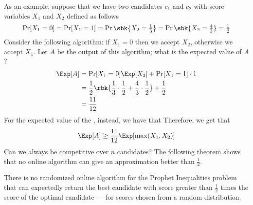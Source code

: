 \documentclass[a4paper, 12pt]{report}
\begin{document}
    As an example, suppose that we have two candidates $c_1$ and $c_2$ with score variables $X_1$ and $X_2$ defined as follows $$\Pr[X_1 = 0] = \Pr[X_1 = 1] = \Pr \sbk{X_2 = \tfrac{1}{3}} = \Pr \sbk {X_2 = \tfrac{4}{3}} = \tfrac{1}{2}$$ Consider the following algorithm: if $X_1 = 0$ then we accept $X_2$, otherwise we accept $X_1$. Let $A$ be the output of this algorithm; what is the expected value of $A$?
    \begin{equation*}
        \begin{split}
            \Exp[A] &= \Pr[X_1 = 0] \Exp[X_2] + \Pr[X_1 = 1] \cdot 1 \\
                    &= \dfrac{1}{2} \rbk{\dfrac{1}{3} \cdot \dfrac{1}{2} + \dfrac{4}{3} \cdot \dfrac{1}{2}} + \dfrac{1}{2} \\
                    &= \dfrac{11}{12}
        \end{split}
    \end{equation*}
    For the expected value of the , instead, we have that
    Therefore, we get that $$\Exp[A] \ge \dfrac{11}{12} \Exp[\max(X_1, X_2)]$$ Can we always be competitive over $n$ candidates? The following theorem shows that no online algorithm can give an approximation better than $\tfrac{1}{2}$.

    \begin{framedthm}{}
        There is no randomized online algorithm for the Prophet Inequalities problem that can expectedly return the best candidate with score greater than $\tfrac{1}{2}$ times the score of the optimal candidate --- for scores chosen from a random distribution.
    \end{framedthm}
\end{document}
